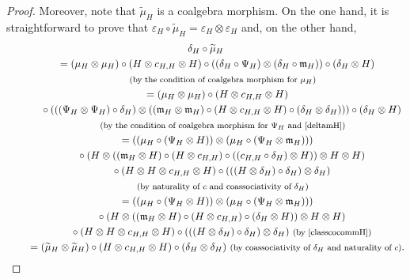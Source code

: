 \documentclass[10pt,a4paper]{amsart}
\numberwithin{equation}{section}
\begin{document}
\begin{proof}
Moreover, note that $\widetilde{\mu}_{H}$ is a coalgebra morphism. On the one hand, it is straightforward to prove that $\varepsilon_{H}\circ\widetilde{\mu}_{H}=\varepsilon_{H}\otimes\varepsilon_{H}$ and, on the other hand,
\begin{gather*}
\delta_{H}\circ\widetilde{\mu}_{H}\\
\qquad{}=(\mu_{H}\otimes\mu_{H})\circ(H\otimes c_{H,H}\otimes H)\circ((\delta_{H}\circ\Psi_{H})\otimes(\delta_{H}\circ\mathfrak{m}_{H}))\circ(\delta_{H}\otimes H)\\
\qquad\quad{}\ \text{\footnotesize\textnormal{(by the condition of coalgebra morphism for $\mu_{H}$)}}\\
\qquad{}=(\mu_{H}\otimes\mu_{H})\circ(H\otimes c_{H,H}\otimes H)\\
\qquad\quad{}\circ(((\Psi_{H}\otimes\Psi_{H})\circ\delta_{H})\otimes((\mathfrak{m}_{H}\otimes\mathfrak{m}_{H})\circ(H\otimes c_{H,H}\otimes H)
\circ(\delta_{H}\otimes\delta_{H})))\circ(\delta_{H}\otimes H)\\
\qquad\quad{}\ \text{\footnotesize\textnormal{(by the condition of coalgebra morphism for $\Psi_{H}$ and \eqref{deltamH})}}\\
\qquad{}=((\mu_{H}\circ(\Psi_{H}\otimes H))\otimes(\mu_{H}\circ(\Psi_{H}\otimes\mathfrak{m}_{H})))\\
\qquad\quad{}\circ(H\otimes((\mathfrak{m}_{H}\otimes H)\circ(H\otimes c_{H,H})\circ((c_{H,H}\circ\delta_{H})\otimes H))\otimes H\otimes H)\\
\qquad\quad{}\circ(H\otimes H\otimes c_{H,H}\otimes H)\circ(((H\otimes\delta_{H})\circ\delta_{H})\otimes\delta_{H})\\
\qquad\quad{}\ \text{\footnotesize\textnormal{(by naturality of $c$ and coassociativity of $\delta_{H}$)}}\\
\qquad{}=((\mu_{H}\circ(\Psi_{H}\otimes H))\otimes(\mu_{H}\circ(\Psi_{H}\otimes\mathfrak{m}_{H})))\\
\qquad\quad{}\circ(H\otimes((\mathfrak{m}_{H}\otimes H)\circ(H\otimes c_{H,H})\circ(\delta_{H}\otimes H))
\otimes H\otimes H)\\
\qquad\quad{}\circ(H\otimes H\otimes c_{H,H}\otimes H)\circ(((H\otimes\delta_{H})\circ\delta_{H})\otimes\delta_{H})\ \text{\footnotesize\textnormal{(by \eqref{classcocommH})}}\\
\qquad{}=(\widetilde{\mu}_{H}\otimes\widetilde{\mu}_{H})\circ(H\otimes c_{H,H}\otimes H)\circ(\delta_{H}\otimes\delta_{H})\ \text{\footnotesize\textnormal{(by coassociativity of $\delta_{H}$ and naturality of $c$)}}.
\end{gather*}


\end{proof}
\end{document}
